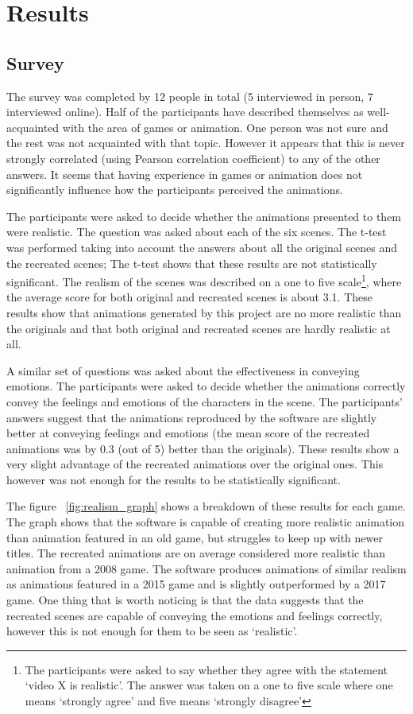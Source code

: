 \chapter{Results \label{chap:results}}

\section{Survey}
The survey was completed by 12 people in total (5 interviewed in person, 7 interviewed online). Half of the participants have described themselves as well-acquainted with the area of games or animation. One person was not sure and the rest was not acquainted with that topic. However it appears that this is never strongly correlated (using Pearson correlation coefficient) to any of the other answers. It seems that having experience in games or animation does not significantly influence how the participants perceived the animations.

The participants were asked to decide whether the animations presented to them were realistic. The question was asked about each of the six scenes. The t-test was performed taking into account the answers about all the original scenes and the recreated scenes; The t-test shows that these results are not statistically significant. The realism of the scenes was described on a one to five scale\footnote{The participants were asked to say whether they agree with the statement  `video X is realistic'. The answer was taken on a one to five scale where one means `strongly agree' and five means `strongly disagree'}, where the average score for both original and recreated scenes is about 3.1. These results show that animations generated by this project are no more realistic than the originals and that both original and recreated scenes are hardly realistic at all.
	
A similar set of questions was asked about the effectiveness in conveying emotions. The participants were asked to decide whether the animations correctly convey the feelings and emotions of the characters in the scene. The participants' answers suggest that the animations reproduced by the software are slightly better at conveying feelings and emotions (the mean score of the recreated animations was by 0.3 (out of 5) better than the originals). These results show a very slight advantage of the recreated animations over the original ones. This however was not enough for the results to be statistically significant.

The figure ~\ref{fig:realism_graph} shows a breakdown of these results for each game. The graph shows that the software is capable of creating more realistic animation than animation featured in an old game, but struggles to keep up with newer titles. The recreated animations are on average considered more realistic than animation from a 2008 game. The software produces animations of similar realism as animations featured in a 2015 game and is slightly outperformed by a 2017 game. One thing that is worth noticing is that the data suggests that the recreated scenes are capable of conveying the emotions and feelings correctly, however this is not enough for them to be seen as `realistic'.

